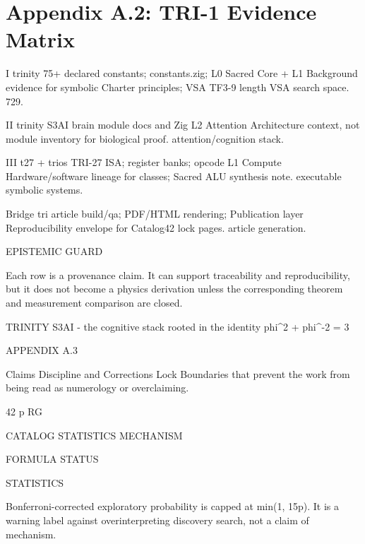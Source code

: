 
\section{Appendix A.2: TRI-1 Evidence Matrix}

I                trinity                75+ declared constants; constants.zig;    L0 Sacred Core + L1         Background evidence for symbolic
                                         Charter principles; VSA TF3-9 length      VSA                         search space.
                                         729.

 II               trinity                S3AI brain module docs and Zig            L2 Attention                Architecture context, not
                                         module inventory for                                                  biological proof.
                                         attention/cognition stack.

 III              t27 + trios            TRI-27 ISA; register banks; opcode        L1 Compute                  Hardware/software lineage for
                                         classes; Sacred ALU synthesis note.                                   executable symbolic systems.

 Bridge           tri article            build/qa; PDF/HTML rendering;             Publication layer           Reproducibility envelope for
                                         Catalog42 lock pages.                                                 article generation.

     EPISTEMIC GUARD

     Each row is a provenance claim. It can support traceability and reproducibility, but it does not become a
     physics derivation unless the corresponding theorem and measurement comparison are closed.

                                TRINITY S3AI - the cognitive stack rooted in the identity phi\textasciicircum{}2 + phi\textasciicircum{}-2 = 3

                                                       APPENDIX A.3

    Claims Discipline and Corrections Lock
      Boundaries that prevent the work from being read as numerology or overclaiming.

                                    42                                       p                              RG

                                 CATALOG                               STATISTICS                         MECHANISM

  FORMULA STATUS

  STATISTICS

  Bonferroni-corrected exploratory probability is capped at min(1, 15p). It is a warning label against
  overinterpreting discovery search, not a claim of mechanism.